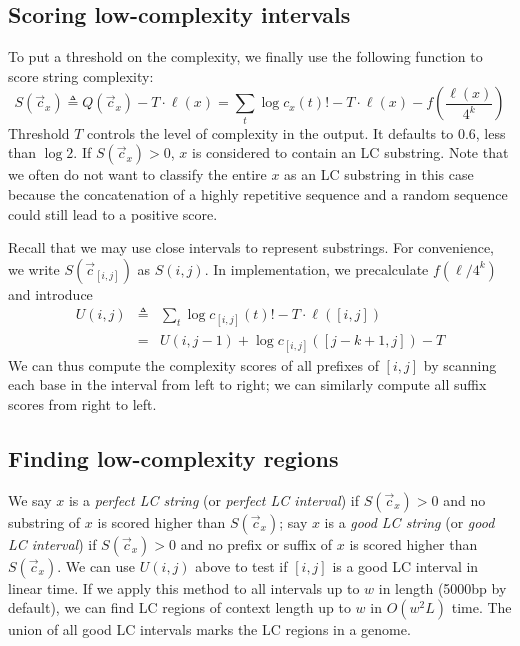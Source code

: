 \documentclass[webpdf,contemporary,large,namedate]{oup-authoring-template}%
\begin{document}
\subsection{Scoring low-complexity intervals}

To put a threshold on the complexity, we finally use the following function to score string complexity:
\begin{equation}\label{eq:S}
S(\vec{c}_x)\triangleq Q(\vec{c}_x)-T\cdot\ell(x)=\sum_t\log c_x(t)!-T\cdot\ell(x)-f\left(\frac{\ell(x)}{4^k}\right)
\end{equation}
Threshold $T$ controls the level of complexity in the output.
It defaults to $0.6$, less than $\log 2$.
If $S(\vec{c}_x)>0$, $x$ is considered to contain an LC substring.
Note that we often do not want to classify the entire $x$ as an LC substring in this case
because the concatenation of a highly repetitive sequence and a random sequence
could still lead to a positive score.

Recall that we may use close intervals to represent substrings.
For convenience, we write $S(\vec{c}_{[i,j]})$ as $S(i,j)$.
In implementation, we precalculate $f(\ell/4^k)$ and introduce
\begin{eqnarray*}
U(i,j)&\triangleq&\sum_t\log c_{[i,j]}(t)!-T\cdot\ell([i,j])\\
&=&U(i,j-1)+\log c_{[i,j]}([j-k+1,j])-T
\end{eqnarray*}
We can thus compute the complexity scores of all prefixes of $[i,j]$
by scanning each base in the interval from left to right;
we can similarly compute all suffix scores from right to left.

\subsection{Finding low-complexity regions}

We say $x$ is a \emph{perfect LC string} (or \emph{perfect LC interval})
if $S(\vec{c}_x)>0$ and no substring of $x$ is scored higher than $S(\vec{c}_x)$;
say $x$ is a \emph{good LC string} (or \emph{good LC interval})
if $S(\vec{c}_x)>0$ and no prefix or suffix of $x$ is scored higher than $S(\vec{c}_x)$.
We can use $U(i,j)$ above to test if $[i,j]$ is a good LC interval in linear time.
If we apply this method to all intervals up to $w$ in length (5000bp by default),
we can find LC regions of context length up to $w$ in $O(w^2L)$ time.
The union of all good LC intervals marks the LC regions in a genome.
\end{document}
